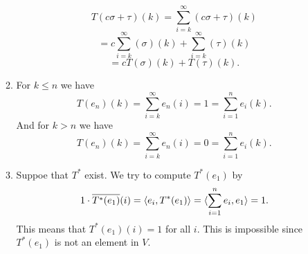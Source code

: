 \begin{enumerate}
\begin{enumerate}
\[T(c\sigma +\tau)(k)=\sum_{i=k}^{\infty}{(c\sigma+\tau)(k)}\]
\[=c\sum_{i=k}^{\infty}{(\sigma)(k)}+\sum_{i=k}^{\infty}{(\tau)(k)}\]
\[=cT(\sigma)(k)+T(\tau)(k).\]
\item For $k\leq n$ we have 
\[T(e_n)(k)=\sum_{i=k}^{\infty}{e_n(i)}=1=\sum_{i=1}^n{e_i}(k).\]
And for $k> n$ we have 
\[T(e_n)(k)=\sum_{i=k}^{\infty}{e_n(i)}=0=\sum_{i=1}^n{e_i}(k).\]
\item Suppoe that $T^*$ exist. We try to compute $T^*(e_1)$ by 
\[1\cdot \overline{T^*(e_1)}(i)=\langle e_i,T^*(e_1)\rangle =\langle \sum_{i=1}^n{e_i},e_1\rangle =1.\]
This means that $T^*(e_1)(i)=1$ for all $i$. This is impossible since $T^*(e_1)$ is not an element in $V$.
\end{enumerate}
\end{enumerate}